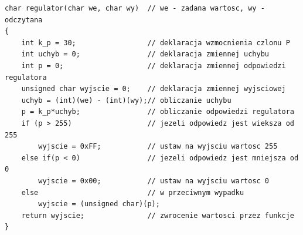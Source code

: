 \begin{lstlisting}[caption=Program realizujący funkcję regulatora P]
char regulator(char we, char wy)  // we - zadana wartosc, wy - odczytana
{
	int k_p = 30;                 // deklaracja wzmocnienia czlonu P
	int uchyb = 0;                // deklaracja zmiennej uchybu
	int p = 0;                    // deklaracja zmiennej odpowiedzi regulatora
	unsigned char wyjscie = 0;    // deklaracja zmiennej wyjsciowej
	uchyb = (int)(we) - (int)(wy);// obliczanie uchybu
	p = k_p*uchyb;                // obliczanie odpowiedzi regulatora
	if (p > 255)                  // jezeli odpowiedz jest wieksza od 255
	    wyjscie = 0xFF;           // ustaw na wyjsciu wartosc 255
	else if(p < 0)                // jezeli odpowiedz jest mniejsza od 0
	    wyjscie = 0x00;           // ustaw na wyjsciu wartosc 0
	else                          // w przeciwnym wypadku
        wyjscie = (unsigned char)(p);
	return wyjscie;               // zwrocenie wartosci przez funkcje
}
\end{lstlisting}
